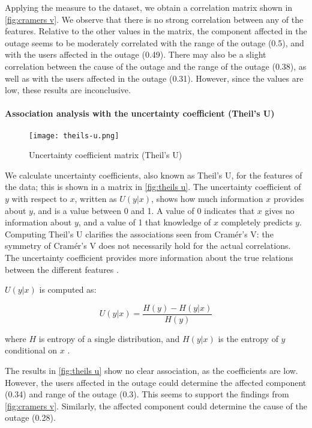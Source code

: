 Applying the measure to the dataset, we obtain a correlation matrix shown in \autoref{fig:cramers v}.
We observe that there is no strong correlation between any of the features.
Relative to the other values in the matrix, the component affected in the outage seems to be moderately correlated with the range of the outage (0.5), and with the users affected in the outage (0.49).
There may also be a slight correlation between the cause of the outage and the range of the outage (0.38), as well as with the users affected in the outage (0.31).
However, since the values are low, these results are inconclusive.

\paragraph{Association analysis with the uncertainty coefficient (Theil's U)}
\begin{figure}
  \centering
  \texttt{[image: theils-u.png]}
  \caption{Uncertainty coefficient matrix (Theil's U)}
  \label{fig:theils u}
\end{figure}

We calculate uncertainty coefficients, also known as Theil's U, for the features of the data; this is shown in a matrix in \autoref{fig:theils u}.
The uncertainty coefficient of $y$ with respect to $x$, written as $U(y|x)$, shows how much information $x$ provides about $y$, and is a value between 0 and 1.
A value of 0 indicates that $x$ gives no information about $y$, and a value of 1 that knowledge of $x$ completely predicts $y$.
Computing Theil's U clarifies the associations seen from Cram\'{e}r's V: the symmetry of Cram\'{e}r's V does not necessarily hold for the actual correlations.
The uncertainty coefficient provides more information about the true relations between the different features \cite{zychlinski2018}.

$U(y|x)$ is computed as:

$$
U(y|x) = \frac{H(y) - H(y|x)}{H(y)}
$$

where $H$ is entropy of a single distribution, and $H(y|x)$ is the entropy of $y$ conditional on $x$ \cite{press2007}.

The results in \autoref{fig:theils u} show no clear association, as the coefficients are low.
However, the users affected in the outage could determine the affected component (0.34) and range of the outage (0.3).
This seems to support the findings from \autoref{fig:cramers v}.
Similarly, the affected component could determine the cause of the outage (0.28).

